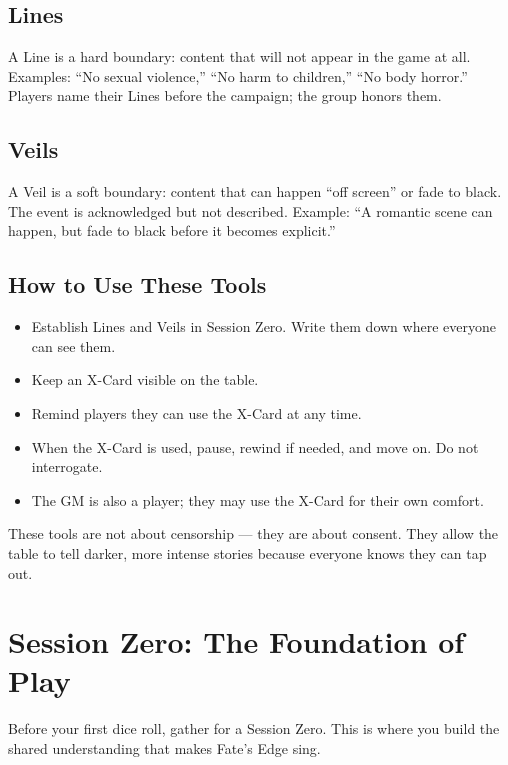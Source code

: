 \documentclass[11pt]{book}
\begin{document}
\subsection*{Lines}
A Line is a hard boundary: content that will not appear in the game at all. Examples: ``No sexual violence,'' ``No harm to children,'' ``No body horror.'' Players name their Lines before the campaign; the group honors them.

\subsection*{Veils}
A Veil is a soft boundary: content that can happen ``off screen'' or fade to black. The event is acknowledged but not described. Example: ``A romantic scene can happen, but fade to black before it becomes explicit.''

\subsection*{How to Use These Tools}
\begin{itemize}
  \item Establish Lines and Veils in Session Zero. Write them down where everyone can see them.
  \item Keep an X-Card visible on the table.
  \item Remind players they can use the X-Card at any time.
  \item When the X-Card is used, pause, rewind if needed, and move on. Do not interrogate.
  \item The GM is also a player; they may use the X-Card for their own comfort.
\end{itemize}

These tools are not about censorship --- they are about consent. They allow the table to tell darker, more intense stories because everyone knows they can tap out.

\section{Session Zero: The Foundation of Play}

Before your first dice roll, gather for a Session Zero. This is where you build the shared understanding that makes Fate's Edge sing.
\end{document}
